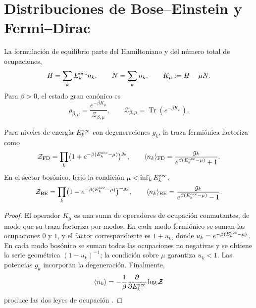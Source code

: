 \section{Distribuciones de Bose--Einstein y Fermi--Dirac}
\label{v:rec:ocupacion:section:02}

La formulación de equilibrio parte del Hamiltoniano y del número total de
ocupaciones,
\begin{equation}
 H=\sum_kE_k^{\rm occ} n_k,
 \qquad
 N=\sum_k n_k,
 \qquad
 K_\mu:=H-\mu N.
 \label{v:rec:eq:hamiltoniano-gran-canonico-rev3}
\end{equation}
Para \(\beta>0\), el estado gran canónico es
\begin{equation}
 \rho_{\beta,\mu}
 =\frac{e^{-\beta K_\mu}}{\mathcal Z_{\beta,\mu}},
 \qquad
 \mathcal Z_{\beta,\mu}
 =\operatorname{Tr}(e^{-\beta K_\mu}).
 \label{v:rec:eq:estado-gran-canonico-rev3}
\end{equation}

\begin{theorem}
\label{v:rec:thm:factorizacion-gran-canonica-rev3}
Para niveles de energía \(E_k^{\rm occ}\) con degeneraciones \(g_k\), la
traza fermiónica factoriza como
\begin{equation}
 \mathcal Z_{\rm FD}
 =\prod_k\bigl(1+e^{-\beta(E_k^{\rm occ}-\mu)}\bigr)^{g_k},
 \qquad
 \langle n_k\rangle_{\rm FD}
 =\frac{g_k}{e^{\beta(E_k^{\rm occ}-\mu)}+1}.
 \label{v:rec:eq:factorizacion-fd-rev3}
\end{equation}
En el sector bosónico, bajo la condición
\(\mu<\inf_kE_k^{\rm occ}\),
\begin{equation}
 \mathcal Z_{\rm BE}
 =\prod_k\bigl(1-e^{-\beta(E_k^{\rm occ}-\mu)}\bigr)^{-g_k},
 \qquad
 \langle n_k\rangle_{\rm BE}
 =\frac{g_k}{e^{\beta(E_k^{\rm occ}-\mu)}-1}.
 \label{v:rec:eq:factorizacion-be-rev3}
\end{equation}
\end{theorem}

\begin{proof}
El operador \(K_\mu\) es una suma de operadores de ocupación conmutantes, de
modo que su traza factoriza por modos. En cada modo fermiónico se suman las
ocupaciones \(0\) y \(1\), y el factor correspondiente es
\(1+u_k\), donde
\(u_k=e^{-\beta(E_k^{\rm occ}-\mu)}\). En cada modo bosónico se suman todas
las ocupaciones no negativas y se obtiene la serie geométrica
\((1-u_k)^{-1}\); la condición sobre \(\mu\) garantiza \(u_k<1\). Las
potencias \(g_k\) incorporan la degeneración. Finalmente,
\[
 \langle n_k\rangle
 =-\frac1\beta\frac{\partial}{\partial E_k^{\rm occ}}
   \log\mathcal Z
\]
produce las dos leyes de ocupación
\cite{Bose1924,Einstein1924,Fermi1926,Dirac1926,Pathria2011}.
\end{proof}
